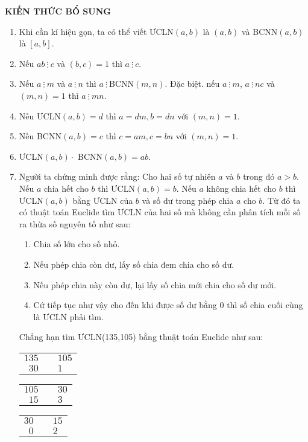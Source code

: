 	\textbf{KIẾN THỨC BỔ SUNG}
	\begin{enumerate}
		\item[\textbf{1.}] Khi cần kí hiệu gọn, ta có thể viết ƯCLN$(a,b)$ là $(a,b)$ và BCNN$(a,b)$ là $[a,b]$.
		\item[\textbf{2.}] Nếu $ab\ \vdots \ c$ và $(b,c) = 1$ thì $a\ \vdots \ c$.
		\item[\textbf{3.}] Nếu $a\ \vdots \ m$ và $a\ \vdots \ n$ thì $a\ \vdots \ $BCNN$(m,n)$. Đặc biệt. nếu $a\ \vdots \ m$, $a\ \vdots \ nc$ và $(m,n) =1$ thì $a\ \vdots \ mn$.
		\item[\textbf{4.}] Nếu ƯCLN$(a,b) = d$ thì $a=dm, b = dn$ với $(m,n)=1$.
		\item[\textbf{5.}] Nếu BCNN$(a,b) = c$ thì $c=am, c = bn$ với $(m,n) = 1$.
		\item[\textbf{6.}] ƯCLN$(a,b) \cdot$ BCNN$(a,b) = ab$.  
		\item[\textbf{7.}] Người ta chứng minh được rằng: Cho hai số tự nhiên $a$ và $b$ trong đó $a>b$. Nếu $a$ chia hết cho $b$ thì ƯCLN$(a,b) = b$. Nếu $a$ không chia hết cho $b$ thì ƯCLN$(a,b)$ bằng ƯCLN của $b$ và số dư trong phép chia $a$ cho $b$. Từ đó ta có thuật toán Euclide tìm ƯCLN của hai số mà không cần phân tích mỗi số ra thừa số nguyên tố như sau:
		\begin{enumerate}
			\item[-] Chia số lớn cho số nhỏ.
			\item[-] Nếu phép chia còn dư, lấy số chia đem chia cho số dư.
			\item[-] Nếu phép chia này còn dư, lại lấy số chia mới chia cho số dư mới.
			\item[-] Cứ tiếp tục như vậy cho đến khi được số dư bằng $0$ thì số chia cuối cùng là ƯCLN phải tìm. 
		\end{enumerate}
		Chẳng hạn tìm ƯCLN(135,105) bằng thuật toán Euclide như sau:

	\begin{center}
		\begin{tabular}{rc|l}
			$135$&&$105$\\
			\cline{3-3}
			$30$&&$1$\\
			
		\end{tabular}

	\begin{tabular}{rc|l}
	$105$&&$30$\\
	\cline{3-3}
	$15$&&$3$\\
	
	\end{tabular}

	\begin{tabular}{rc|l}
	$30$&&$15$\\
	\cline{3-3}
	$0$&&$2$\\
	
	\end{tabular}
	\end{center}
	\end{enumerate}
